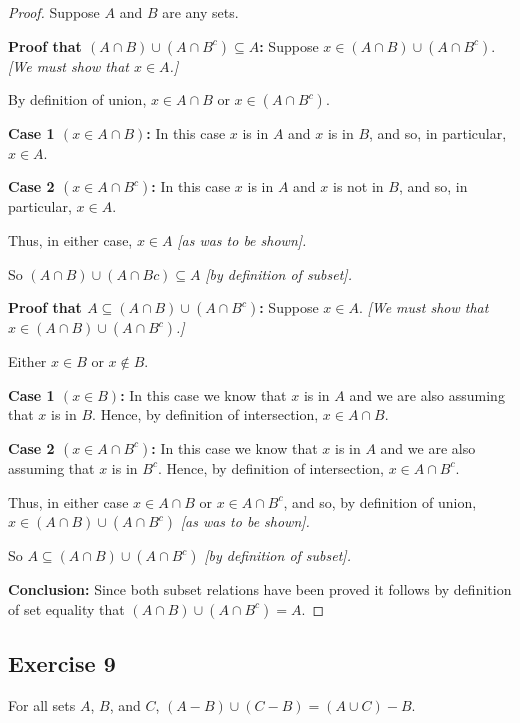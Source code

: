 \documentclass[14pt]{extarticle}
\begin{document}
\begin{proof}
Suppose $A$ and $B$ are any sets.

{\bf Proof that \((A \cap B) \cup (A \cap B^c) \subseteq A\):} Suppose \(x \in (A \cap B) \cup (A \cap B^c)\). 
{\it [We must show that \(x \in A\).]}

By definition of union, \(x \in A \cap B\) or \(x \in (A \cap B^c)\).

{\bf Case 1 \((x \in A \cap B)\):} In this case $x$ is in $A$ and $x$ is in $B$, and so, in particular, \(x \in A\).

{\bf Case 2 \((x \in A \cap B^c)\):} In this case $x$ is in $A$ and $x$ is not in $B$, and so, in particular, \(x \in A\).

Thus, in either case, \(x \in A\) {\it [as was to be shown].} 

So \((A \cap B) \cup (A \cap B c ) \subseteq A\) {\it [by definition of subset].}

{\bf Proof that \(A \subseteq (A \cap B) \cup (A \cap B^c )\):} Suppose \(x \in A\). {\it [We must show that 
\(x \in (A \cap B) \cup (A \cap B^c)\).]}

Either \(x \in B\) or \(x \notin B\).

{\bf Case 1 \((x \in B)\):} In this case we know that $x$ is in $A$ and we are also assuming that $x$ is in $B$. 
Hence, by definition of intersection, \(x \in A \cap B\).

{\bf Case 2 \((x \in A \cap B^c)\):} In this case we know that $x$ is in $A$ and we are also assuming that $x$ is in 
$B^c$. Hence, by definition of intersection, \(x \in A \cap B^c\).

Thus, in either case \(x \in A \cap B\) or \(x \in A \cap B^c\), and so, by definition of union, \(x \in (A \cap B) 
\cup (A \cap B^c)\) {\it [as was to be shown].} 

So \(A \subseteq (A \cap B) \cup (A \cap B^c)\) {\it [by definition of subset].}

{\bf Conclusion:} Since both subset relations have been proved it follows by definition of set equality that 
\((A \cap B) \cup (A \cap B^c) = A\).
\end{proof}

\subsection{Exercise 9}
For all sets $A$, $B$, and $C$, \((A - B) \cup (C - B) = (A \cup C) - B\).
\end{document}
